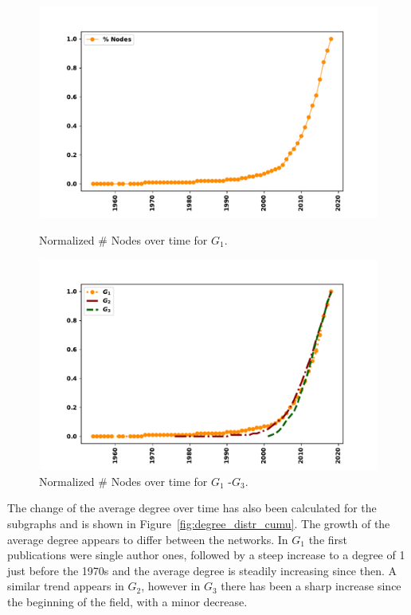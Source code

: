 \documentclass{article}
\theoremstyle{definition}
\begin{document}
\begin{figure}[!hbtp]
    \begin{minipage}{.45\textwidth}
        \centering
        \includegraphics[width=\textwidth]{./assets/images/nodes_percentage_over_time.pdf}
        \caption{Normalized \# Nodes over time for \(G_1\).}\label{fig:nodes_cumu_pd}
    \end{minipage}%
    \begin{minipage}{.45\textwidth}
        \centering
        \includegraphics[width=\textwidth]{./assets/images/percentage_networks_nodes.pdf}
        \caption{Normalized \# Nodes over time for \(G_1\) -\(G_3\).}\label{fig:nodes_cumu}
    \end{minipage}
\end{figure}

The change of the average degree over time has also been calculated for the
subgraphs and is shown in Figure~\ref{fig:degree_distr_cumu}. The growth of
the average degree appears to differ between the networks. In \(G_1\) the first
publications were single author ones, followed by a steep increase
to a degree of 1 just before the 1970s and the average degree is steadily increasing
since then. A similar trend appears in \(G_2\), however in \(G_3\)
there has been a sharp increase since the beginning of the field, with
a minor decrease.
\end{document}
